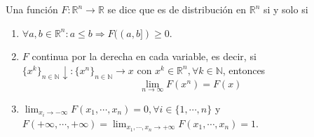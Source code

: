 \begin{defn}
  Una función $F: \mathbb{R}^{n} \to \mathbb{R}$ se dice que es de distribución en $\mathbb{R}^{n}$ si y solo si
  \begin{enumerate}[label=(\roman*)]
    \item $\forall a, b \in \mathbb{R}^{n} :  a \leq b \Rightarrow F((a, b]) \geq 0$.
    \item $F$ continua por la derecha en cada variable, es decir, si $\{ x^{k} \}_{n \in \mathbb{N}} \downarrow : \{ x^{n} \}_{n \in \mathbb{N}} \rightarrow x$ con $x^{k} \in \mathbb{R}^{n}, \forall k \in \mathbb{N}$, entonces
    \[ 
      \lim_{n \to \infty} F(x^{n}) = F(x)
    \] 
    \item $\lim_{x_{i} \to -\infty} F(x_{1}, \cdots, x_{n}) = 0, \forall i \in \{ 1, \cdots, n \}$ y $F(+ \infty, \cdots, + \infty) = \lim_{x_{1}, \cdots, x_{n} \to + \infty} F(x_{1}, \cdots, x_{n}) = 1$.
  \end{enumerate}
\end{defn}
